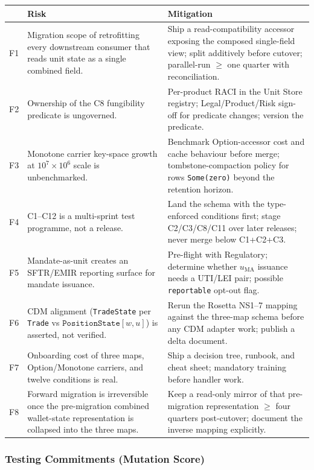 \begin{longtable}{@{}p{0.5cm}p{6.3cm}p{6.3cm}@{}}
\toprule
& \textbf{Risk} & \textbf{Mitigation} \\
\midrule
\endhead
F1 & Migration scope of retrofitting every downstream consumer that reads unit state as a single combined field. & Ship a read-compatibility accessor exposing the composed single-field view; split additively before cutover; parallel-run $\geq$ one quarter with reconciliation. \\
F2 & Ownership of the C8 fungibility predicate is ungoverned. & Per-product RACI in the Unit Store registry; Legal/Product/Risk sign-off for predicate changes; version the predicate. \\
F3 & Monotone carrier key-space growth at $10^7\times10^6$ scale is unbenchmarked. & Benchmark Option-accessor cost and cache behaviour before merge; tombstone-compaction policy for rows \texttt{Some(zero)} beyond the retention horizon. \\
F4 & C1--C12 is a multi-sprint test programme, not a release. & Land the schema with the type-enforced conditions first; stage C2/C3/C8/C11 over later releases; never merge below C1+C2+C3. \\
F5 & Mandate-as-unit creates an SFTR/EMIR reporting surface for mandate issuance. & Pre-flight with Regulatory; determine whether $u_{\mathrm{MA}}$ issuance needs a UTI/LEI pair; possible \texttt{reportable} opt-out flag. \\
F6 & CDM alignment (\texttt{TradeState} per \texttt{Trade} vs $\texttt{PositionState}[w,u]$) is asserted, not verified. & Rerun the Rosetta NS1--7 mapping against the three-map schema before any CDM adapter work; publish a delta document. \\
F7 & Onboarding cost of three maps, Option/Monotone carriers, and twelve conditions is real. & Ship a decision tree, runbook, and cheat sheet; mandatory training before handler work. \\
F8 & Forward migration is irreversible once the pre-migration combined wallet-state representation is collapsed into the three maps. & Keep a read-only mirror of that pre-migration representation $\geq$ four quarters post-cutover; document the inverse mapping explicitly. \\
\bottomrule
\end{longtable}

\subsubsection{Testing Commitments (Mutation Score)}

